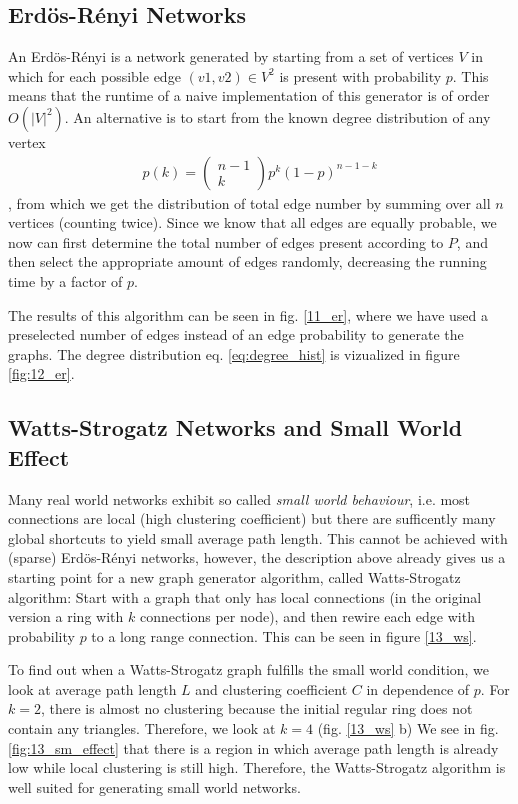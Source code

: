 \documentclass{scrartcl}
\begin{document}
\subsection{Erdös-Rényi Networks}
An Erdös-Rényi is a network generated by starting from a set of vertices $V$ in which for each possible edge $(v1, v2) \in V^2$ is present with probability $p$. This means that the runtime of a naive implementation of this generator is of order $O(|V|^2)$. An alternative is to start from the known degree distribution of any vertex 
\begin{align}
p(k) = \left( \begin{array}{c}n-1 \\ k \end{array} \right) p^k (1-p)^{n-1-k} \label{eq:degree_hist}
\end{align}, from which we get the distribution of total edge number by summing over all $n$ vertices (counting twice). 
Since we know that all edges are equally probable, we now can first determine the total number of edges present according to $P$, and then select the appropriate amount of edges randomly, decreasing the running time by a factor of $p$.

The results of this algorithm can be seen in fig. \ref{11_er}, where we have used a preselected number of edges instead of an edge probability to generate the graphs.
The degree distribution eq. \eqref{eq:degree_hist} is vizualized in figure \ref{fig:12_er}.

\subsection{Watts-Strogatz Networks and Small World Effect}
Many real world networks exhibit so called \emph{small world behaviour}, i.e. most connections are local (high clustering coefficient) but there are sufficently many global shortcuts to yield small average path length. This cannot be achieved with (sparse) Erdös-Rényi networks, however, the description above already gives us a starting point for a new graph generator algorithm, called Watts-Strogatz algorithm: Start with a graph that only has local connections (in the original version a ring with $k$ connections per node), and then rewire each edge with probability $p$ to a long range connection. This can be seen in figure \ref{13_ws}.

To find out when a Watts-Strogatz graph fulfills the small world condition, we look at average path length $L$ and clustering coefficient $C$ in dependence of $p$. For $k=2$, there is almost no clustering because the initial regular ring does not contain any triangles. Therefore, we look at $k=4$ (fig. \ref{13_ws} b) We see in fig. \ref{fig:13_sm_effect} that there is a region in which average path length is already low while local clustering is still high. Therefore, the Watts-Strogatz algorithm is well suited for generating small world networks.
\end{document}
